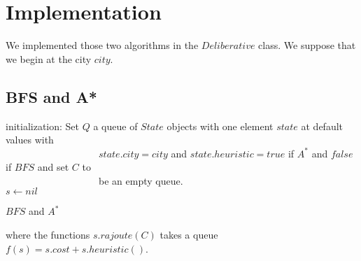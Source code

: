 \documentclass[11pt]{article}
\begin{document}
\section{Implementation}
We implemented those two algorithms in the $Deliberative$ class. We suppose that we begin at the city $city$.
\subsection{BFS and A*}
\begin{algorithm}[H]
	\SetAlgoLined
	initialization: Set $Q$ a queue of $State$ objects with one element $state$ at default values with\\  
	\ \ \ \ \ \ \ \ \ \ \ \ \ \ \ \ \ \ \ $state.city = city$ and $state.heuristic = true$ if $A^*$ and $false$ if $BFS$ and set $C$ to\\ \ \ \ \ \ \ \ \ \ \ \ \ \ \ \ \ \ \ \ be an empty queue.\\
	$s\leftarrow nil$\\
	\caption{$BFS$ and $A^*$}
\end{algorithm}
where the functions $s.rajoute(C)$ takes a queue  $f(s) = s.cost + s.heuristic()$. %
\end{document}
